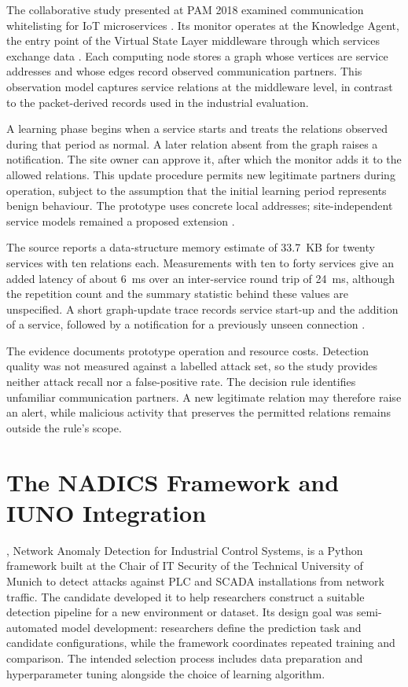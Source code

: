 The collaborative study presented at PAM 2018 examined communication whitelisting for IoT
microservices \cite{aubet2018graph}. Its monitor operates at the Knowledge Agent, the entry
point of the Virtual State Layer middleware through which services exchange data
\cite{pahl2016distributed}. Each computing node stores a graph whose vertices are service
addresses and whose edges record observed communication partners. This observation model
captures service relations at the middleware level, in contrast to the packet-derived records
used in the industrial evaluation.

A learning phase begins when a service starts and treats the relations observed during that
period as normal. A later relation absent from the graph raises a notification. The site owner
can approve it, after which the monitor adds it to the allowed relations. This update procedure
permits new legitimate partners during operation, subject to the assumption that the initial
learning period represents benign behaviour. The prototype uses concrete local addresses;
site-independent service models remained a proposed extension \cite{aubet2018graph}.

The source reports a data-structure memory estimate of 33.7~KB for twenty services with ten
relations each. Measurements with ten to forty services give an added latency of about 6~ms
over an inter-service round trip of 24~ms, although the repetition count and the summary
statistic behind these values are unspecified. A short graph-update trace records service
start-up and the addition of a service, followed by a notification for a previously unseen
connection \cite{aubet2018graph}.

The evidence documents prototype operation and resource costs. Detection quality was not
measured against a labelled attack set, so the study provides neither attack recall nor a
false-positive rate. The decision rule identifies unfamiliar communication partners. A new
legitimate relation may therefore raise an alert, while malicious activity that preserves the
permitted relations remains outside the rule's scope.

\section{The NADICS Framework and IUNO Integration}
\label{sec:anomaly:nadics}
\label{sec:anomaly:5}

\nadics{}, Network Anomaly Detection for Industrial Control Systems, is a Python framework
built at the Chair of IT Security of the Technical University of Munich to detect attacks
against PLC and SCADA installations from network traffic. The candidate developed it to help
researchers construct a suitable detection pipeline for a new environment or dataset. Its
design goal was semi-automated model development: researchers define the prediction task and
candidate configurations, while the framework coordinates repeated training and comparison.
The intended selection process includes data preparation and hyperparameter tuning alongside
the choice of learning algorithm.

